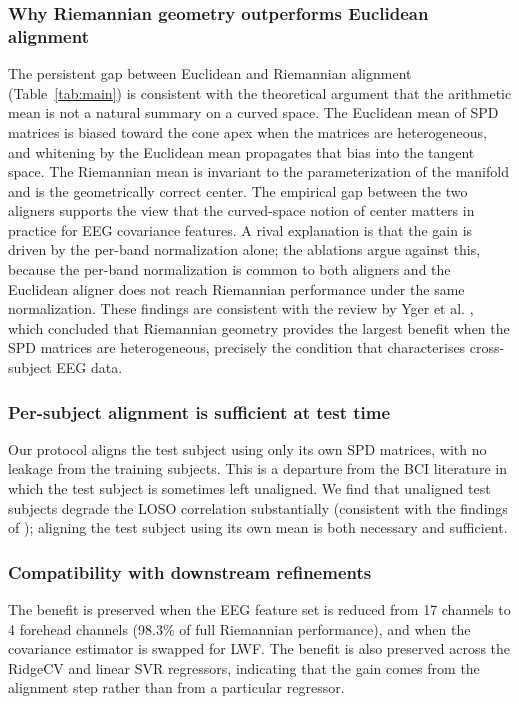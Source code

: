 \documentclass[journal,twoside,web]{ieeecolor2}
\begin{document}
\subsubsection{Why Riemannian geometry outperforms Euclidean alignment} The persistent gap between Euclidean and Riemannian
alignment (Table~\ref{tab:main}) is consistent with the theoretical
argument that the arithmetic mean is not a natural summary on a
curved space. The Euclidean mean of SPD matrices is biased toward the
cone apex when the matrices are heterogeneous, and whitening by the
Euclidean mean propagates that bias into the tangent space. The
Riemannian mean is invariant to the parameterization of the manifold
and is the geometrically correct center. The empirical gap between the
two aligners supports the view that the curved-space notion of center
matters in practice for EEG covariance features. A rival explanation
is that the gain is driven by the per-band normalization alone; the
ablations argue against this, because the per-band normalization is
common to both aligners and the Euclidean aligner does not reach
Riemannian performance under the same normalization. These findings
are consistent with the review by Yger et al. \cite{yger2017riemannian},
which concluded that Riemannian geometry provides the largest benefit
when the SPD matrices are heterogeneous, precisely the condition that
characterises cross-subject EEG data.

\subsubsection{Per-subject alignment is sufficient at test time} Our protocol aligns
the test subject using only its own SPD matrices, with no leakage
from the training subjects. This is a departure from the BCI
literature in which the test subject is sometimes left unaligned. We
find that unaligned test subjects degrade the LOSO correlation
substantially (consistent with the findings of
\cite{zanini2018}); aligning the test subject using its own mean is
both necessary and sufficient.

\subsubsection{Compatibility with downstream refinements} The benefit is preserved when the EEG feature set is
reduced from 17 channels to 4 forehead channels (98.3\% of full
Riemannian performance), and when the covariance estimator is swapped
for LWF. The benefit is also preserved across the RidgeCV and linear
SVR regressors, indicating that the gain comes from the alignment step
rather than from a particular regressor.
\end{document}
